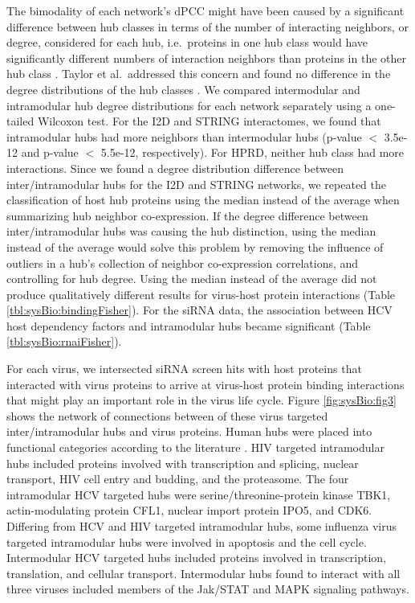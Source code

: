 The bimodality of each network's dPCC might have been caused by a
significant difference between hub classes in terms of the number of
interacting neighbors, or degree, considered for each hub,
i.e.\ proteins in one hub class would have significantly different
numbers of interaction neighbors than proteins in the other hub class
\cite{taylor09}. Taylor et al.\ addressed this concern and found no
difference in the degree distributions of the hub classes
\cite{taylor09}. We compared intermodular and intramodular hub degree
distributions for each network separately using a one-tailed Wilcoxon
test. For the I2D and STRING interactomes, we found that intramodular
hubs had more neighbors than intermodular hubs (p-value $<$ 3.5e-12
and p-value $<$ 5.5e-12, respectively). For HPRD, neither hub class
had more interactions. Since we found a degree distribution difference
between inter/intramodular hubs for the I2D and STRING networks, we
repeated the classification of host hub proteins using the median
instead of the average when summarizing hub neighbor co-expression. If
the degree difference between inter/intramodular hubs was causing the
hub distinction, using the median instead of the average would solve
this problem by removing the influence of outliers in a hub's
collection of neighbor co-expression correlations, and controlling for
hub degree. Using the median instead of the average did not produce
qualitatively different results for virus-host protein interactions
(Table \ref{tbl:sysBio:bindingFisher}). For the siRNA data, the
association between HCV host dependency factors and intramodular hubs
became significant (Table \ref{tbl:sysBio:rnaiFisher}).



For each virus, we intersected siRNA screen hits with host proteins
that interacted with virus proteins to arrive at virus-host protein
binding interactions that might play an important role in the virus
life cycle. Figure \ref{fig:sysBio:fig3} shows the network of
connections between of these virus targeted inter/intramodular hubs
and virus proteins. Human hubs were placed into functional categories
according to the literature \cite{bushman09,taylor09}. HIV targeted
intramodular hubs included proteins involved with transcription and
splicing, nuclear transport, HIV cell entry and budding, and the
proteasome. The four intramodular HCV targeted hubs were
serine/threonine-protein kinase TBK1, actin-modulating protein CFL1,
nuclear import protein IPO5, and CDK6. Differing from HCV and HIV
targeted intramodular hubs, some influenza virus targeted intramodular
hubs were involved in apoptosis and the cell cycle. Intermodular HCV
targeted hubs included proteins involved in transcription,
translation, and cellular transport. Intermodular hubs found to
interact with all three viruses included members of the Jak/STAT and
MAPK signaling pathways.

